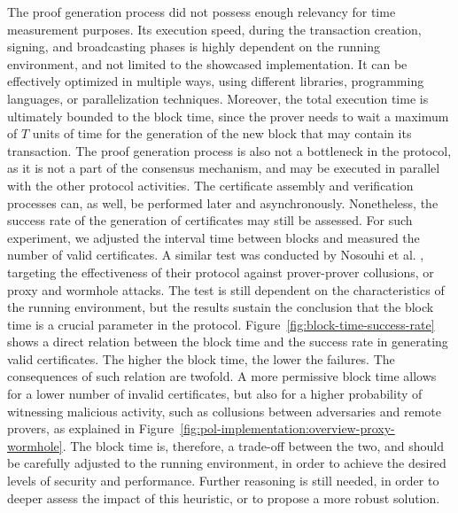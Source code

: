 The proof generation process did not possess enough relevancy for time measurement purposes. Its execution speed, during the transaction creation, signing, and broadcasting phases is highly dependent on the running environment, and not limited to the showcased implementation. It can be effectively optimized in multiple ways, using different libraries, programming languages, or parallelization techniques. Moreover, the total execution time is ultimately bounded to the block time, since the prover needs to wait a maximum of $T$ units of time for the generation of the new block that may contain its transaction. The proof generation process is also not a bottleneck in the protocol, as it is not a part of the consensus mechanism, and may be executed in parallel with the other protocol activities. The certificate assembly and verification processes can, as well, be performed later and asynchronously. Nonetheless, the success rate of the generation of \pol{} certificates may still be assessed. For such experiment, we adjusted the interval time between blocks and measured the number of valid \pol{} certificates. A similar test was conducted by Nosouhi et al. \cite{nosouhi2020blockchain}, targeting the effectiveness of their protocol against prover-prover collusions, or proxy and wormhole attacks. The test is still dependent on the characteristics of the running environment, but the results sustain the conclusion that the block time is a crucial parameter in the protocol. Figure~\ref{fig:block-time-success-rate} shows a direct relation between the block time and the success rate in generating valid certificates. The higher the block time, the lower the failures. The consequences of such relation are twofold. A more permissive block time allows for a lower number of invalid certificates, but also for a higher probability of witnessing malicious activity, such as collusions between adversaries and remote provers, as explained in Figure~\ref{fig:pol-implementation:overview-proxy-wormhole}. The block time is, therefore, a trade-off between the two, and should be carefully adjusted to the running environment, in order to achieve the desired levels of security and performance. Further reasoning is still needed, in order to deeper assess the impact of this heuristic, or to propose a more robust solution.

